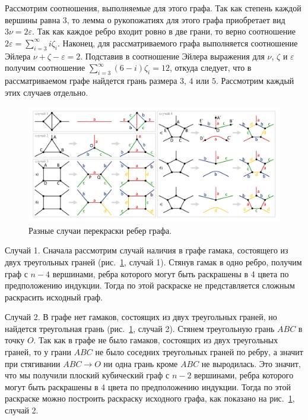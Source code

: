 Рассмотрим соотношения, выполняемые для этого графа.
Так как степень каждой вершины равна $3$, то лемма о рукопожатиях для этого графа приобретает вид $3 \nu = 2 \varepsilon$.
Так как каждое ребро входит ровно в две грани, то верно соотношение $2 \varepsilon = \sum_{i = 3}^{\infty}{i \zeta_i}$.
Наконец, для рассматриваемого графа выполняется соотношение Эйлера $\nu + \zeta - \varepsilon = 2$.
Подставив в соотношение Эйлера выражения для $\nu$, $\zeta$ и $\varepsilon$ получим соотношение $\sum_{i = 3}^{\infty}{(6 - i) \zeta_i} = 12$, откуда следует, что в рассматриваемом графе найдется грань размера $3$, $4$ или $5$.
Рассмотрим каждый этих случаев отдельно.

\begin{figure}[ht]
\centering
\includegraphics[width=1.0\textwidth]{fig/par_coloring4_cases.pdf}
\singlespacing
{}\caption{Разные случаи перекраски ребер графа.}
\label{fig:par_coloring4_cases}
\end{figure}

Случай 1. Сначала рассмотрим случай наличия в графе гамака, состоящего из двух треугольных граней (рис.~\ref{fig:par_coloring4_cases}, случай 1).
Стянув гамак в одно ребро, получим граф с $n - 4$ вершинами, ребра которого могут быть раскрашены в 4 цвета по предположению индукции.
Тогда по этой раскраске не представляется сложным раскрасить исходный граф.

Случай 2. В графе нет гамаков, состоящих из двух треугольных граней, но найдется треугольная грань (рис.~\ref{fig:par_coloring4_cases}, случай 2).
Стянем треугольную грань $ABC$ в точку $O$.
Так как в графе не было гамаков, состоящих из двух треугольных граней, то у грани $ABC$ не было соседних треугольных граней по ребру, а значит при стягивании $ABC \rightarrow O$ ни одна грань кроме $ABC$ не выродилась.
Это значит, что мы получили плоский кубический граф с $n - 2$ вершинами, ребра которого могут быть раскрашены в 4 цвета по предположению индукции.
Тогда по этой раскраске можно построить раскраску исходного графа, как показано на рис.~\ref{fig:par_coloring4_cases}, случай 2.

